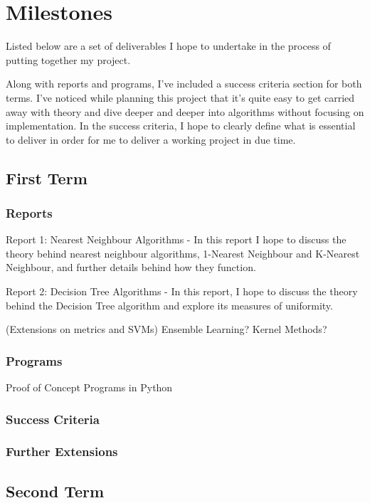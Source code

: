 \documentclass[a4paper,12pt]{article}
\begin{document}
\section{Milestones}
Listed below are a set of deliverables I hope to undertake in the process of putting together my project. \par 
Along with reports and programs, I've included a success criteria section for both terms. I've noticed while planning this project that it's quite easy to get carried away with theory and dive deeper and deeper into algorithms without focusing on implementation. In the success criteria, I hope to clearly define what is essential to deliver in order for me to deliver a working project in due time. 
\subsection{First Term}
\subsubsection{Reports}
Report 1: Nearest Neighbour Algorithms - In this report I hope to discuss the theory behind nearest neighbour algorithms, 1-Nearest Neighbour and K-Nearest Neighbour, and further details behind how they function. \par 
Report 2: Decision Tree Algorithms - In this report, I hope to discuss the theory behind the Decision Tree algorithm and explore its measures of uniformity. \par
(Extensions on metrics and SVMs) Ensemble Learning? Kernel Methods?

\subsubsection{Programs}
Proof of Concept Programs in Python

\subsubsection{Success Criteria}
\subsubsection{Further Extensions}


\subsection{Second Term}
\end{document}
